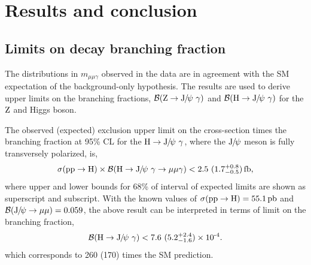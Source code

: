 \chapter{Results and conclusion}
\label{Chap:Results}

\section{Limits on decay branching fraction}
The distributions in $m_{\mu\mu\gamma}$ observed in the data are in agreement with the SM expectation of the background-only hypothesis.
The results are used to derive upper limits on the branching fractions, $\mathcal{B}(\mathrm{Z}\to{\mathrm{J}\hspace{-.08em}/\hspace{-.14em}\psi}\ \gamma)$ and $\mathcal{B}(\mathrm{H}\to{\mathrm{J}\hspace{-.08em}/\hspace{-.14em}\psi}\ \gamma)$ for the $\mathrm{Z}$ and Higgs boson.

The observed (expected) exclusion upper limit on the cross-section times the branching fraction at 95\% CL for the $\mathrm{H}\to{\mathrm{J}\hspace{-.08em}/\hspace{-.14em}\psi}\ \gamma$, where the ${\mathrm{J}\hspace{-.08em}/\hspace{-.14em}\psi}$ meson is fully transversely polarized, is,
\begin{equation}
	\displaystyle
	\sigma(\Pp\Pp\to\PH)\times\mathcal{B}(\PH\to\JPsi\ \gamma\to\mu\mu\gamma)<2.5\ (1.7^{+0.8}_{-0.5})\fb,
	\end{equation}
where upper and lower bounds for 68\% of interval of expected limits are shown as superscript and subscript. 
With the known values of $\sigma(\mathrm{p}\mathrm{p}\to\mathrm{H})=55.1\mbox{\ensuremath{\,\text{pb}}}$ and $\mathcal{B}({\mathrm{J}\hspace{-.08em}/\hspace{-.14em}\psi}\to\mu\mu) = 0.059$, the above result can be interpreted in terms of limit on  the branching fraction,
\begin{equation}
	\displaystyle
	\mathcal{B}(\PH\to\JPsi\ \gamma)<7.6\ (5.2^{+2.4}_{-1.6})\ten{-4}.
	\end{equation}
which corresponds to 260 (170) times the SM prediction.  

